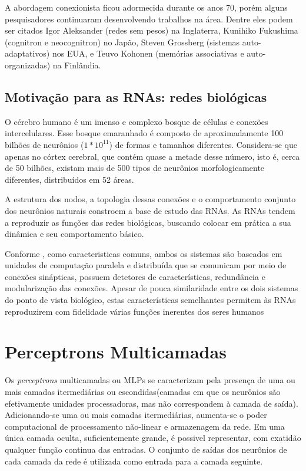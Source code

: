 \documentclass[
	12pt,				%
	openright,			%
	twoside,			%
	a4paper,			%
	english,			%
	french,				%
	spanish,			%
	brazil				%
	]{abntex2}
\begin{document}
A abordagem conexionista ficou adormecida durante os anos 70, porém alguns pesquisadores continuaram desenvolvendo trabalhos na área. Dentre eles podem ser citados Igor Aleksander (redes sem pesos) na Inglaterra, Kunihiko Fukushima (cognitron e neocognitron) no Japão, Steven Grossberg (sistemas auto-adaptativos) nos EUA, e Teuvo Kohonen (memórias associativas e auto-organizadas) na Finlândia.

\subsection{Motivação para as RNAs: redes biológicas}
O cérebro humano é um imenso e complexo bosque de células e conexões intercelulares. Esse bosque emaranhado é composto de aproximadamente 100 bilhões de neurônios ($ 1 * 10^{11}$) de formas e tamanhos diferentes. Considera-se que apenas no córtex cerebral, que contém quase a metade desse número, isto é, cerca de 50 bilhões, existam mais de 500 tipos de neurônios morfologicamente diferentes, distribuídos em 52 áreas.\cite[p.18]{mora2016continuum} 

A estrutura dos nodos, a topologia dessas conexões e o comportamento conjunto dos neurônios naturais constroem a base de estudo das RNAs. As RNAs tendem a reproduzir as funções das redes biológicas, buscando colocar em prática a sua dinâmica e seu comportamento básico. 

Conforme , como caracteristicas comuns, ambos os sistemas são baseados em unidades de computação paralela e distribuída que se comunicam por meio de conexões sinápticas, possuem detetores de características, redundância e modularização das conexões. Apesar de pouca similaridade entre os dois sistemas do ponto de vista biológico, estas características semelhantes permitem às RNAs reproduzirem com fidelidade várias funções inerentes dos seres humanos

\section{Perceptrons Multicamadas}

Os \emph{perceptrons} multicamadas ou MLPs se caracterizam pela presença de uma ou mais camadas itermediárias ou escondidas(camadas em que os neurônios são efetivamente unidades processadoras, mas não correspondem à camada de saída). Adicionando-se uma ou mais camadas itermediárias, aumenta-se o poder computacional de processamento não-linear e armazenagem da rede. Em uma única camada oculta, suficientemente grande, é possivel representar, com exatidão qualquer função continua das entradas. O conjunto de saídas dos neurônios de cada camada da rede é utilizada como entrada para a camada seguinte.\cite[p.40]{duarte2009mp}
\end{document}
